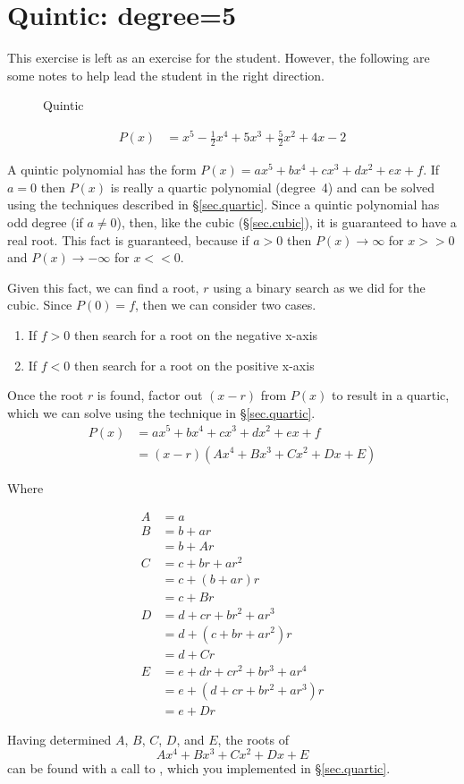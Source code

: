\section{Quintic: degree=5}
\label{sec.quintic}

This exercise is left as an exercise for the student.  However, the
following are some notes to help lead the student in the right
direction.

\begin{figure}
\centering

\caption{Quintic}
\label{fig.quintic}
\end{figure}

\begin{align*}
  P(x) &= x^5 - \frac{1}{2} x^4 + 5 x^3 + \frac{5}{2} x^2 + 4 x - 2
\end{align*}


A quintic polynomial has the form $P(x) = a x^5 + b x^4 + c x^3 + d x^2 + e x + f$.
If $a=0$ then $P(x)$ is really a quartic polynomial
(degree~4) and can be solved using the techniques described in
\S\ref{sec.quartic}.  Since a quintic polynomial has odd degree
(if $a\neq 0$), then, like the cubic (\S\ref{sec.cubic}), it is
guaranteed to have a real root.  This fact is guaranteed, because if
$a>0$ then $P(x)\to \infty$ for $x>>0$ and $P(x)\to -\infty$ for
$x<<0$.

Given this fact, we can find a root, $r$ using a binary search as we
did for the cubic.  Since $P(0) = f$, then we can consider two cases.
\begin{enumerate}
\item If $f>0$ then search for a root on the negative x-axis
\item If $f<0$ then search for a root on the positive x-axis
\end{enumerate}

Once the root $r$ is found, factor out $(x-r)$ from $P(x)$ to result
in a quartic, which we can solve using the technique in
\S\ref{sec.quartic}.
\begin{align*}
  P(x) &= a x^5 + b x^4 + c x^3 + d x^2 + e x + f\\
  &= (x - r) (Ax^4 + B x^3 + C x^2 + D x + E)
\end{align*}

Where

\begin{align}
  A &= a\label{eq.8.A}\\
  B &= b + a r\nonumber\\
   &= b + A r\label{eq.8.B}\\
  C &= c + b r + a r^2\nonumber\\
  &= c + (b + a r)r\nonumber\\
  &= c + B r\label{eq.8.C}\\
  D &= d + c r + b r^2 + a r^3\nonumber\\
  &= d + ( c + b r + a r^2)r\nonumber\\
  &= d + C r\label{eq.8.D}\\
  E &= e + d r + c r^2 + b r^3 + a r^4\nonumber\\
  &= e + ( d + c r + b r^2 + a r^3)r\nonumber\\
  &= e + D r\label{eq.8.E}
\end{align}


Having determined $A$, $B$, $C$, $D$, and $E$, the roots of
\[A x^4 + B x^3 + C x^2 + D x + E\] can be
found with a call to , which you
implemented in \S\ref{sec.quartic}.



